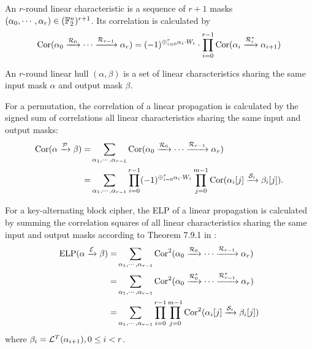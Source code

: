 \begin{definition}
    An $r$-round linear characteristic is a sequence of $r+1$ masks $(\alpha_0,\cdots,\alpha_r)\in(\mathbb{F}_2^n)^{r+1}$. Its correlation is calculated by
    \begin{align*}
        \text{Cor}(\alpha_0\xrightarrow{\mathcal{R}_0}\cdots\xrightarrow{\mathcal{R}_{r-1}}\alpha_r)
        =(-1)^{\oplus_{i=0}^r \alpha_i\cdot W_i}\cdot\prod\limits_{i=0}^{r-1}\text{Cor}(\alpha_i\xrightarrow{\mathcal{R}_i^*}\alpha_{i+1})
    \end{align*}
\end{definition}

\begin{definition}
    An $r$-round linear hull $(\alpha,\beta)$ is a set of linear characteristics sharing the same input mask $\alpha$ and output mask $\beta$. 
\end{definition}

For a permutation, the correlation of a linear propagation is calculated by the signed sum of correlations all linear characteristics sharing the same input and output masks:
\begin{align*}
    \text{Cor}(\alpha\xrightarrow{\mathcal{P}}\beta)=&\sum\limits_{\alpha_1,\cdots,\alpha_{r-1}}\text{Cor}(\alpha_0\xrightarrow{\mathcal{R}_0}\cdots\xrightarrow{\mathcal{R}_{r-1}}\alpha_r)\\
    =&\sum\limits_{\alpha_1,\cdots,\alpha_{r-1}}\prod\limits_{i=0}^{r-1} (-1)^{\oplus_{i=0}^r \alpha_i\cdot W_i} \prod\limits_{j=0}^{m-1}\text{Cor}(\alpha_i[j]\xrightarrow{\mathcal{S}_i}\beta_i[j]).
\end{align*}

For a key-alternating block cipher, the ELP of a linear propagation is calculated by summing the correlation squares of all linear characteristics sharing the same input and output masks according to Theorem 7.9.1 in \cite{daemen2002design}:
\begin{align*}
    \text{ELP}(\alpha\xrightarrow{\mathcal{E}}\beta)=&\sum\limits_{\alpha_1,\cdots,\alpha_{r-1}}\text{Cor}^2(\alpha_0\xrightarrow{\mathcal{R}_0}\cdots\xrightarrow{\mathcal{R}_{r-1}}\alpha_r)\\
    =&\sum\limits_{\alpha_1,\cdots,\alpha_{r-1}}\text{Cor}^2(\alpha_0\xrightarrow{\mathcal{R}_0^*}\cdots\xrightarrow{\mathcal{R}_{r-1}^*}\alpha_r)\\
    =&\sum\limits_{\alpha_1,\cdots,\alpha_{r-1}}\prod\limits_{i=0}^{r-1}\prod\limits_{j=0}^{m-1}\text{Cor}^2(\alpha_i[j]\xrightarrow{\mathcal{S}_i}\beta_i[j])
\end{align*}
where $\beta_i=\mathcal{L}^T(\alpha_{i+1}),0\leq i<r$.



